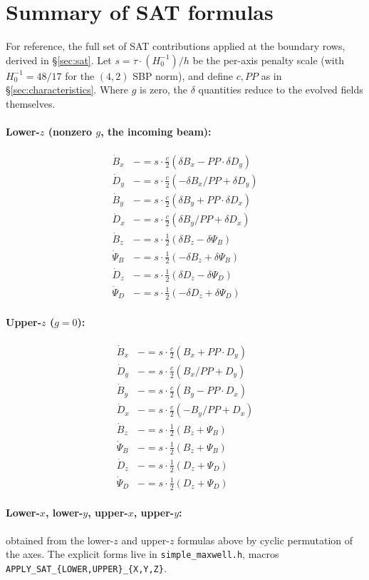 \documentclass[11pt]{article}
\begin{document}
\appendix

\section{Summary of SAT formulas}
\label{app:sat-formulas}

For reference, the full set of SAT contributions applied at the
boundary rows, derived in \S\ref{sec:sat}.  Let
$s = \tau \cdot (H^{-1}_0)/h$ be the per-axis penalty scale
(with $H^{-1}_0 = 48/17$ for the $(4,2)$ SBP norm), and define
$c, PP$ as in \S\ref{sec:characteristics}.  Where $g$ is zero, the
$\delta$ quantities reduce to the evolved fields themselves.

\paragraph{Lower-$z$ (nonzero $g$, the incoming beam):}
\begin{align*}
  \dot B_x   &\mathrel{-}= s \cdot \tfrac{c}{2} (\delta B_x - PP \cdot \delta D_y) \\
  \dot D_y   &\mathrel{-}= s \cdot \tfrac{c}{2} (-\delta B_x / PP + \delta D_y) \\
  \dot B_y   &\mathrel{-}= s \cdot \tfrac{c}{2} (\delta B_y + PP \cdot \delta D_x) \\
  \dot D_x   &\mathrel{-}= s \cdot \tfrac{c}{2} (\delta B_y / PP + \delta D_x) \\
  \dot B_z   &\mathrel{-}= s \cdot \tfrac{1}{2} (\delta B_z - \delta \Psi_B) \\
  \dot \Psi_B &\mathrel{-}= s \cdot \tfrac{1}{2} (-\delta B_z + \delta \Psi_B) \\
  \dot D_z   &\mathrel{-}= s \cdot \tfrac{1}{2} (\delta D_z - \delta \Psi_D) \\
  \dot \Psi_D &\mathrel{-}= s \cdot \tfrac{1}{2} (-\delta D_z + \delta \Psi_D)
\end{align*}

\paragraph{Upper-$z$ ($g = 0$):}
\begin{align*}
  \dot B_x   &\mathrel{-}= s \cdot \tfrac{c}{2} (B_x + PP \cdot D_y) \\
  \dot D_y   &\mathrel{-}= s \cdot \tfrac{c}{2} (B_x / PP + D_y) \\
  \dot B_y   &\mathrel{-}= s \cdot \tfrac{c}{2} (B_y - PP \cdot D_x) \\
  \dot D_x   &\mathrel{-}= s \cdot \tfrac{c}{2} (-B_y / PP + D_x) \\
  \dot B_z   &\mathrel{-}= s \cdot \tfrac{1}{2} (B_z + \Psi_B) \\
  \dot \Psi_B &\mathrel{-}= s \cdot \tfrac{1}{2} (B_z + \Psi_B) \\
  \dot D_z   &\mathrel{-}= s \cdot \tfrac{1}{2} (D_z + \Psi_D) \\
  \dot \Psi_D &\mathrel{-}= s \cdot \tfrac{1}{2} (D_z + \Psi_D)
\end{align*}

\paragraph{Lower-$x$, lower-$y$, upper-$x$, upper-$y$:} obtained
from the lower-$z$ and upper-$z$ formulas above by cyclic
permutation of the axes.  The explicit forms live in
\texttt{simple\_maxwell.h}, macros
\texttt{APPLY\_SAT\_\{LOWER,UPPER\}\_\{X,Y,Z\}}.
\end{document}
